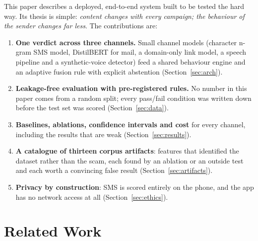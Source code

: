 \documentclass[conference]{IEEEtran}
\begin{document}
This paper describes a deployed, end-to-end system built to be tested the hard
way. Its thesis is simple: \emph{content changes with every campaign; the
behaviour of the sender changes far less}. The contributions are:
\begin{enumerate}
\item \textbf{One verdict across three channels.} Small channel models
  (character n-gram SMS model, DistilBERT for mail, a domain-only link model,
  a speech pipeline and a synthetic-voice detector) feed a shared behaviour
  engine and an adaptive fusion rule with explicit abstention (Section~\ref{sec:arch}).
\item \textbf{Leakage-free evaluation with pre-registered rules.} No number in
  this paper comes from a random split; every pass/fail condition was written
  down before the test set was scored (Section~\ref{sec:data}).
\item \textbf{Baselines, ablations, confidence intervals and cost} for every
  channel, including the results that are weak (Section~\ref{sec:results}).
\item \textbf{A catalogue of thirteen corpus artifacts}: features that
  identified the dataset rather than the scam, each found by an ablation or an
  outside test and each worth a convincing false result (Section~\ref{sec:artifacts}).
\item \textbf{Privacy by construction}: SMS is scored entirely on the phone,
  and the app has no network access at all (Section~\ref{sec:ethics}).
\end{enumerate}

\section{Related Work}
\end{document}

